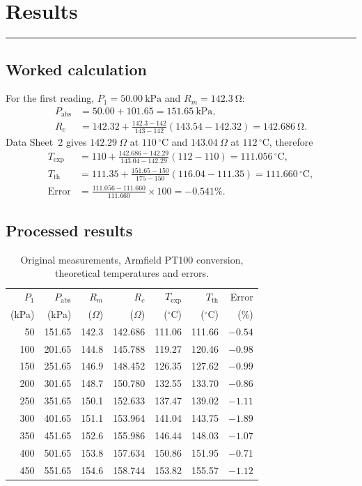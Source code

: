 \documentclass[11pt,a4paper]{article}
\newcommand{\sectionrule}{\vspace{-2pt}\color{rulegray}\hrule\color{black}\vspace{5pt}}
\begin{document}
\section{Results}
\sectionrule
\subsection{Worked calculation}
For the first reading, $P_1=\SI{50.00}{\kilo\pascal}$ and
$R_m=\SI{142.3}{\ohm}$:
\begin{align}
 P_{\mathrm{abs}}&=50.00+101.65=\SI{151.65}{\kilo\pascal},\\
 R_c&=142.32+\frac{142.3-142}{143-142}(143.54-142.32)
     =\SI{142.686}{\ohm}.
\end{align}
Data Sheet~2 gives $142.29~\Omega$ at $110\,{}^\circ\mathrm{C}$ and
$143.04~\Omega$ at $112\,{}^\circ\mathrm{C}$, therefore
\begin{align}
 T_{\mathrm{exp}}&=110+\frac{142.686-142.29}{143.04-142.29}(112-110)
 =111.056\,{}^\circ\mathrm{C},\\
 T_{\mathrm{th}}&=111.35+\frac{151.65-150}{175-150}(116.04-111.35)
 =111.660\,{}^\circ\mathrm{C},\\
 \mathrm{Error}&=\frac{111.056-111.660}{111.660}\times100=-0.541\%.
\end{align}

\subsection{Processed results}
\begin{table}[H]
  \centering
  \caption{Original measurements, Armfield PT100 conversion, theoretical temperatures and errors.}
  \label{tab:results}
  \small
  \begin{tabular}{rrrrrrr}
    \toprule
    $P_1$ & $P_{\mathrm{abs}}$ & $R_m$ & $R_c$ & $T_{\mathrm{exp}}$ & $T_{\mathrm{th}}$ & Error \\
    (kPa) & (kPa) & ($\Omega$) & ($\Omega$) & ($^\circ$C) & ($^\circ$C) & (\%) \\
    \midrule
     50 & 151.65 & 142.3 & 142.686 & 111.06 & 111.66 & $-0.54$ \\
    100 & 201.65 & 144.8 & 145.788 & 119.27 & 120.46 & $-0.98$ \\
    150 & 251.65 & 146.9 & 148.452 & 126.35 & 127.62 & $-0.99$ \\
    200 & 301.65 & 148.7 & 150.780 & 132.55 & 133.70 & $-0.86$ \\
    250 & 351.65 & 150.1 & 152.633 & 137.47 & 139.02 & $-1.11$ \\
    300 & 401.65 & 151.1 & 153.964 & 141.04 & 143.75 & $-1.89$ \\
    350 & 451.65 & 152.6 & 155.986 & 146.44 & 148.03 & $-1.07$ \\
    400 & 501.65 & 153.8 & 157.634 & 150.86 & 151.95 & $-0.71$ \\
    450 & 551.65 & 154.6 & 158.744 & 153.82 & 155.57 & $-1.12$ \\
    \bottomrule
  \end{tabular}
\end{table}
\end{document}
